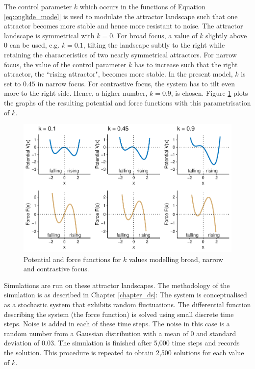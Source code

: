 The control parameter $k$ which occurs in the functions of Equation \ref{eq:onglide_model} is used to modulate the attractor landscape such that one attractor becomes more stable and hence more resistant to noise. The attractor landscape is symmetrical with $k=0$. For broad focus, a value of $k$ slightly above $0$ can be used, e.g. $k=0.1$, tilting the landscape subtly to the right while retaining the characteristics of two nearly symmetrical attractors. For narrow focus, the value of the control parameter $k$ has to increase such that the right attractor, the ``rising attractor", becomes more stable. In the present model, $k$ is set to $0.45$ in narrow focus. For contrastive focus, the system has to tilt even more to the right side. Hence, a higher number, $k=0.9$, is chosen. Figure \ref{fig:potentials_force_br_na_co} plots the graphs of the resulting potential and force functions with this parametrisation of $k$.

\begin{figure}
\includegraphics[width=\textwidth]{figures/ch6/potentials_force.pdf}
\caption{Potential and force functions for $k$ values modelling broad, narrow and contrastive focus.}
\label{fig:potentials_force_br_na_co}
\end{figure}

Simulations are run on these attractor landscapes. The methodology of the simulation is as described in Chapter \ref{chapter_ds}: The system is conceptualised as a stochastic system that exhibits random fluctuations. The differential function describing the system (the force function) is solved using small discrete time steps. Noise is added in each of these time steps. The noise in this case is a random number from a Gaussian distribution with a mean of $0$ and standard deviation of $0.03$. The simulation is finished after 5,000 time steps and records the solution. This procedure is repeated to obtain 2,500 solutions for each value of $k$.

